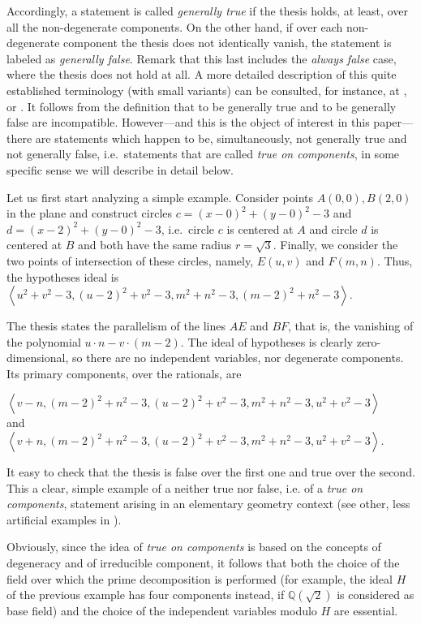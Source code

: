 \documentclass{article}
\begin{document}
 Accordingly,  a statement is called \emph{generally true} if the thesis holds, at least, over all the non-degenerate components. 
On the other hand, if over each non-degenerate component the thesis does not identically vanish, the statement is labeled as \emph{generally false}. Remark that this last includes the \emph{always false} case, where the thesis does not hold at all. A more detailed description of this quite established terminology (with small variants) can be consulted, for instance, at \cite{RV99}, \cite{CLS} or \cite{ZWS}.   It follows from the definition that  to be generally true and to be generally false are incompatible.  However---and this is the object of interest in this paper---there are statements which happen to be,  simultaneously, not generally true and not generally false, i.e.~statements that are called \cite{ZWS} \emph{true on components}, in some specific sense we will describe in detail below.

Let us first start analyzing a simple example. Consider  points $A (0,0), B (2,0)$ in the plane and construct circles $c= (x-0)^2+(y-0)^2-3$ and $d=(x-2)^2+(y-0)^2-3$, i.e.~circle $c$ is centered at $A$ and circle $d$ is centered at $B$ and both have the same radius $r=\sqrt 3$.  Finally, we consider the two points of intersection of these circles, namely, $E (u, v)$ and $F (m, n)$. Thus, the hypotheses ideal is 
 $\left< u^2+v^2-3,(u-2)^2+v^2-3,  m^2+n^2-3, (m-2)^2+n^2-3\right>.$
 
 The thesis states the parallelism of the lines $AE$ and $BF$, that is, the vanishing of the polynomial
 $u\cdot n-v\cdot(m-2).$
 \noindent The ideal of hypotheses is clearly zero-dimensional, so there are no independent variables, nor degenerate components. Its primary components, over the rationals, are
\begin{center}
$\left<v-n, (m-2)^2+n^2-3, (u-2)^2+v^2-3, m^2+n^2-3, u^2+v^2-3\right>$\\and\\
$\left<v+n, (m-2)^2+n^2-3, (u-2)^2+v^2-3, m^2+n^2-3, u^2+v^2-3\right>$.
\end{center}  
  It easy to check that the thesis is false over the first one and true over the second. This a clear, simple example of a neither true nor false, i.e. of a  \emph{true on components}, statement arising in an elementary geometry context (see other, less artificial examples in \cite{RV99,BR}).
  
 Obviously, since the idea of \emph{true on components} is based on the concepts of degeneracy and of irreducible component, it follows that both the choice of the field over which the prime decomposition is performed (for example, the ideal $ H $ of the previous example has four components instead, if  
  $\mathbb{Q}(\sqrt{2})$ is considered as base field) and the choice of the independent variables modulo $H$ are essential. 
  
\end{document}
